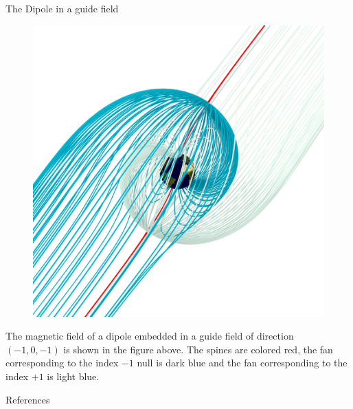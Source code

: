 \documentclass[final]{beamer}
\newlength{\onecolwid}
\begin{document}
\begin{frame}[t]
\begin{columns}[t]
\begin{column}{\onecolwid}
\begin{block}{The Dipole in a guide field}
    \begin{figure}
    \includegraphics[width=\onecolwid]{fig/separatrix_dipole.png}
    \end{figure}

    The magnetic field of a dipole embedded in a guide field of direction $(-1,0,-1)$ is
    shown in the figure above. 
    The spines are colored red, the fan corresponding to the
    index $-1$ null is dark blue and the fan corresponding to the
    index $+1$ is light blue. 


\end{block}



\begin{block}{References}

\nocite{*} %
\small{
\vspace{0.75in}}


\end{block}
\end{column}
\end{columns}
\end{frame}
\end{document}
